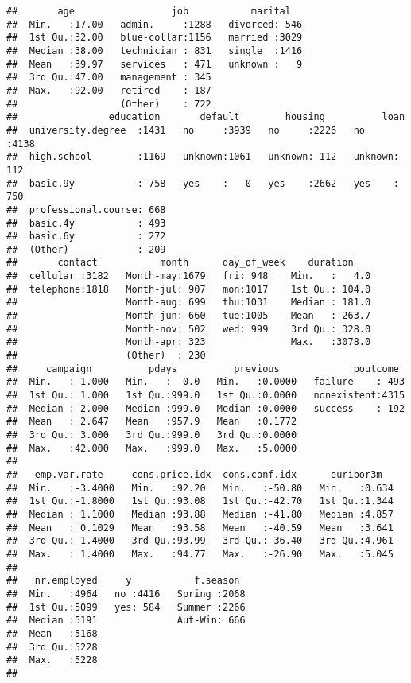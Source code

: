 \documentclass[]{article}
\begin{document}
\begin{verbatim}
##       age                 job           marital    
##  Min.   :17.00   admin.     :1288   divorced: 546  
##  1st Qu.:32.00   blue-collar:1156   married :3029  
##  Median :38.00   technician : 831   single  :1416  
##  Mean   :39.97   services   : 471   unknown :   9  
##  3rd Qu.:47.00   management : 345                  
##  Max.   :92.00   retired    : 187                  
##                  (Other)    : 722                  
##                education       default        housing          loan     
##  university.degree  :1431   no     :3939   no     :2226   no     :4138  
##  high.school        :1169   unknown:1061   unknown: 112   unknown: 112  
##  basic.9y           : 758   yes    :   0   yes    :2662   yes    : 750  
##  professional.course: 668                                               
##  basic.4y           : 493                                               
##  basic.6y           : 272                                               
##  (Other)            : 209                                               
##       contact           month      day_of_week    duration     
##  cellular :3182   Month-may:1679   fri: 948    Min.   :   4.0  
##  telephone:1818   Month-jul: 907   mon:1017    1st Qu.: 104.0  
##                   Month-aug: 699   thu:1031    Median : 181.0  
##                   Month-jun: 660   tue:1005    Mean   : 263.7  
##                   Month-nov: 502   wed: 999    3rd Qu.: 328.0  
##                   Month-apr: 323               Max.   :3078.0  
##                   (Other)  : 230                               
##     campaign          pdays          previous             poutcome   
##  Min.   : 1.000   Min.   :  0.0   Min.   :0.0000   failure    : 493  
##  1st Qu.: 1.000   1st Qu.:999.0   1st Qu.:0.0000   nonexistent:4315  
##  Median : 2.000   Median :999.0   Median :0.0000   success    : 192  
##  Mean   : 2.647   Mean   :957.9   Mean   :0.1772                     
##  3rd Qu.: 3.000   3rd Qu.:999.0   3rd Qu.:0.0000                     
##  Max.   :42.000   Max.   :999.0   Max.   :5.0000                     
##                                                                      
##   emp.var.rate     cons.price.idx  cons.conf.idx      euribor3m    
##  Min.   :-3.4000   Min.   :92.20   Min.   :-50.80   Min.   :0.634  
##  1st Qu.:-1.8000   1st Qu.:93.08   1st Qu.:-42.70   1st Qu.:1.344  
##  Median : 1.1000   Median :93.88   Median :-41.80   Median :4.857  
##  Mean   : 0.1029   Mean   :93.58   Mean   :-40.59   Mean   :3.641  
##  3rd Qu.: 1.4000   3rd Qu.:93.99   3rd Qu.:-36.40   3rd Qu.:4.961  
##  Max.   : 1.4000   Max.   :94.77   Max.   :-26.90   Max.   :5.045  
##                                                                    
##   nr.employed     y           f.season   
##  Min.   :4964   no :4416   Spring :2068  
##  1st Qu.:5099   yes: 584   Summer :2266  
##  Median :5191              Aut-Win: 666  
##  Mean   :5168                            
##  3rd Qu.:5228                            
##  Max.   :5228                            
## 
\end{verbatim}
\end{document}
